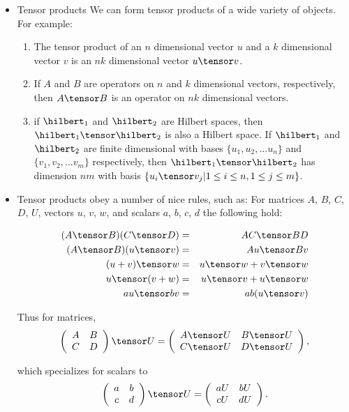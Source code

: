 \documentclass{slides}
\begin{document}
\begin{slide}{}
\begin{itemize}
	\item Tensor products \newline
	We can form tensor products of a wide variety of objects.  For example: 
	\begin{enumerate}
		\item The tensor product of an $n$ dimensional vector $u$ and a $k$ dimensional vector $v$ is 				an $nk$ dimensional vector $u \tensor v$.
		\item If $A$ and $B$ are operators on $n$ and $k$ dimensional vectors, respectively, then $A \tensor B$ is an operator on $nk$ dimensional vectors.
		\item if $\hilbert_1$ and $\hilbert_2$ are Hilbert spaces, then $\hilbert_1 \tensor \hilbert_2$ is also a Hilbert space.  If $\hilbert_1$ and $\hilbert_2$ are finite dimensional with bases $\{u_1, u_2, \ldots u_n\}$ and $\{v_1, v_2, \ldots v_m\}$ respectively, then $\hilbert_1 \tensor \hilbert_2$ has dimension $nm$ with basis $\{u_i \tensor v_j | 1 \le i \le n, 1 \le j \le m\}$.
\end{enumerate}
\end{itemize}
\end{slide}

\begin{slide}{}
\begin{itemize}
		\item Tensor products obey a number of nice rules, such as:
		For matrices $A$, $B$, $C$, $D$, $U$, vectors $u$, $v$, $w$, and scalars $a$, $b$, $c$, $d$ the following hold:

\begin{eqnarray*}
(A \tensor B) (C \tensor D) &=& AC\tensor BD\\
(A \tensor B) (u \tensor v) &=& Au\tensor Bv\\
(u+v)\tensor w&=& u\tensor w + v\tensor w\\
u\tensor(v+w)&=& u\tensor v + u\tensor w\\
au\tensor bv &=& ab(u\tensor v)
\end{eqnarray*}

Thus for matrices,
$$\left(\begin{array}{cc}A & B\\C & D\end{array}\right) \tensor U = 
\left(\begin{array}{cc}A \tensor U & B \tensor U\\C \tensor U & D \tensor U\end{array}\right),$$

which specializes for scalars to
$$\left(\begin{array}{cc}a & b\\c & d\end{array}\right) \tensor U = 
\left(\begin{array}{cc}a U & b U\\c U & d U\end{array}\right).$$

\end{itemize}
\end{slide}
\end{document}
